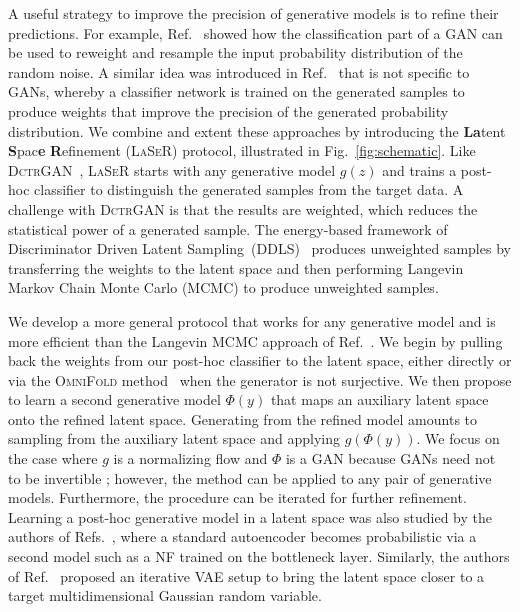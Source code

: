 A useful strategy to improve the precision of generative models is to refine their predictions. For example, Ref.~\cite{che2020gan} showed how the classification part of a GAN can be used to reweight and resample the input probability distribution of the random noise. A similar idea was introduced in Ref.~\cite{2009.03796} that is not specific to GANs, whereby a classifier network is trained on the generated samples to produce weights that improve the precision of the generated probability distribution. We combine and extent these approaches by introducing the \textbf{La}tent \textbf{S}pac\textbf{e} \textbf{R}efinement (\textsc{LaSeR}) protocol, illustrated in Fig.~\ref{fig:schematic}. Like \textsc{DctrGAN}~\cite{2009.03796,Andreassen:2019nnm}, \textsc{LaSeR} starts with any generative model $g(z)$ and trains a post-hoc classifier to distinguish the generated samples from the target data. A challenge with \textsc{DctrGAN} is that the results are weighted, which reduces the statistical power of a generated sample. The energy-based framework of Discriminator Driven Latent Sampling~(DDLS)~\cite{che2020gan} produces unweighted samples by transferring the weights to the latent space and then performing Langevin Markov Chain Monte Carlo (MCMC) to produce unweighted samples.  

We develop a more general protocol that works for any generative model and is more efficient than the Langevin MCMC approach of Ref.~\cite{che2020gan}. We begin by pulling back the weights from our post-hoc classifier to the latent space, either directly or via the \textsc{OmniFold} method~\cite{Andreassen:2019cjw} when the generator is not surjective. We then propose to learn a second generative model $\Phi(y)$ that maps an auxiliary latent space onto the refined latent space. Generating from the refined model amounts to sampling from the auxiliary latent space and applying $g(\Phi(y))$. We focus on the case where $g$ is a normalizing flow and $\Phi$ is a GAN because GANs need not to be invertible
; however, the method can be applied to any pair of generative models. Furthermore, the procedure can be iterated for further refinement.  Learning a post-hoc generative model in a latent space was also studied by the authors of Refs.~\cite{bohm2020probabilistic,GMMN,xiao2019generative}, where a standard autoencoder becomes probabilistic via a second model such as a NF trained on the bottleneck layer. Similarly, the authors of Ref.~\cite{dai2018diagnosing} proposed an iterative VAE setup to bring the latent space closer to a target multidimensional Gaussian random variable.

